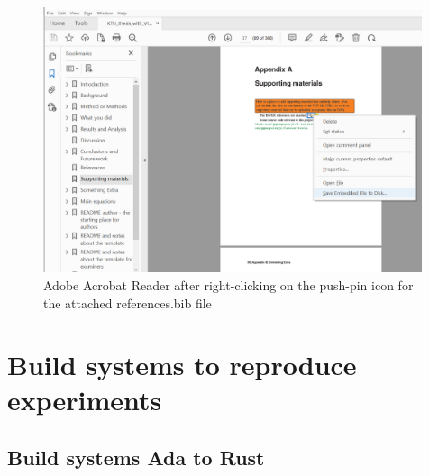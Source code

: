 \documentclass[nomenclature, english, bibtex]{kththesis}
\begin{document}
\begin{figure}[!ht]
  \begin{center}
    \includegraphics[width=0.99\textwidth]{README_notes/Bib-save-embedded-example.png}
  \end{center}
  \caption{Adobe Acrobat Reader after right-clicking on the push-pin icon for the attached references.bib file}
  \label{fig:PDFreaderPushpinExample}
 \end{figure}
 \FloatBarrier
 \cleardoublepage

\chapter{Build systems to reproduce experiments}
\label{sec:buildSystems}

\section{Build systems Ada to Rust}
\end{document}
